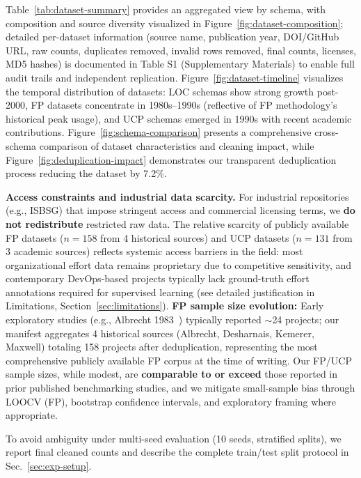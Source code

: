 \documentclass{ieeeaccess}
\begin{document}
Table~\ref{tab:dataset-summary} provides an aggregated view by schema, with composition and source diversity visualized in Figure~\ref{fig:dataset-composition}; detailed per-dataset information (source name, publication year, DOI/GitHub URL, raw counts, duplicates removed, invalid rows removed, final counts, licenses, MD5 hashes) is documented in Table S1 (Supplementary Materials) to enable full audit trails and independent replication. Figure~\ref{fig:dataset-timeline} visualizes the temporal distribution of datasets: LOC schemas show strong growth post-2000, FP datasets concentrate in 1980s--1990s (reflective of FP methodology's historical peak usage), and UCP schemas emerged in 1990s with recent academic contributions. Figure~\ref{fig:schema-comparison} presents a comprehensive cross-schema comparison of dataset characteristics and cleaning impact, while Figure~\ref{fig:deduplication-impact} demonstrates our transparent deduplication process reducing the dataset by 7.2\%.

\textbf{Access constraints and industrial data scarcity.} For industrial repositories (e.g., ISBSG\cite{isbsg2025overview}) that impose stringent access and commercial licensing terms, we \textbf{do not redistribute} restricted raw data. The relative scarcity of publicly available FP datasets ($n{=}158$ from 4 historical sources) and UCP datasets ($n{=}131$ from 3 academic sources) reflects systemic access barriers in the field: most organizational effort data remains proprietary due to competitive sensitivity, and contemporary DevOps-based projects typically lack ground-truth effort annotations required for supervised learning (see detailed justification in Limitations, Section~\ref{sec:limitations}). \textbf{FP sample size evolution:} Early exploratory studies (e.g., Albrecht 1983~\cite{albrecht1983software}) typically reported $\sim$24 projects; our manifest aggregates 4 historical sources (Albrecht, Desharnais, Kemerer, Maxwell) totaling 158 projects after deduplication, representing the most comprehensive publicly available FP corpus at the time of writing. Our FP/UCP sample sizes, while modest, are \textbf{comparable to or exceed} those reported in prior published benchmarking studies, and we mitigate small-sample bias through LOOCV (FP), bootstrap confidence intervals, and exploratory framing where appropriate.

To avoid ambiguity under multi-seed evaluation (10 seeds, stratified splits), we report final cleaned counts and describe the complete train/test split protocol in Sec.~\ref{sec:exp-setup}. 
\end{document}
